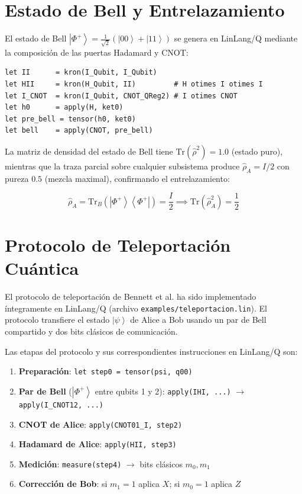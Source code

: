 \documentclass[12pt, a4paper, openany]{report}
\theoremstyle{definition}
\newcommand{\ket}[1]{\left|#1\right\rangle}
\newcommand{\bra}[1]{\left\langle#1\right|}
\newcommand{\density}{\hat{\rho}}
\newcommand{\tr}{\mathrm{Tr}}
\begin{document}
\section{Estado de Bell y Entrelazamiento}

El estado de Bell $\ket{\Phi^+} = \frac{1}{\sqrt{2}}(\ket{00} + \ket{11})$ se genera en LinLang/Q mediante la composición de las puertas Hadamard y CNOT:

\begin{lstlisting}[caption={Generación del estado de Bell en LinLang/Q}]
let II      = kron(I_Qubit, I_Qubit)
let HII     = kron(H_Qubit, II)         # H otimes I otimes I
let I_CNOT  = kron(I_Qubit, CNOT_QReg2) # I otimes CNOT
let h0      = apply(H, ket0)
let pre_bell = tensor(h0, ket0)
let bell    = apply(CNOT, pre_bell)
\end{lstlisting}

La matriz de densidad del estado de Bell tiene $\tr(\density^2) = 1.0$ (estado puro), mientras que la traza parcial sobre cualquier subsistema produce $\density_A = I/2$ con pureza $0.5$ (mezcla maximal), confirmando el entrelazamiento:

\begin{equation}
  \density_A = \tr_B(\ket{\Phi^+}\bra{\Phi^+}) = \frac{I}{2}
  \implies \tr(\density_A^2) = \frac{1}{2}
\end{equation}

\section{Protocolo de Teleportación Cuántica}

El protocolo de teleportación de Bennett et al.\cite{bennett1993} ha sido implementado íntegramente en LinLang/Q (archivo \texttt{examples/teleportacion.lin}). El protocolo transfiere el estado $\ket{\psi}$ de Alice a Bob usando un par de Bell compartido y dos bits clásicos de comunicación.

Las etapas del protocolo y sus correspondientes instrucciones en LinLang/Q son:

\begin{enumerate}
  \item \textbf{Preparación}: \texttt{let step0 = tensor(psi, q00)}
  \item \textbf{Par de Bell} ($\ket{\Phi^+}$ entre qubits 1 y 2): \texttt{apply(IHI, ...)} $\to$ \texttt{apply(I\_CNOT12, ...)}
  \item \textbf{CNOT de Alice}: \texttt{apply(CNOT01\_I, step2)}
  \item \textbf{Hadamard de Alice}: \texttt{apply(HII, step3)}
  \item \textbf{Medición}: \texttt{measure(step4)} $\to$ bits clásicos $m_0, m_1$
  \item \textbf{Corrección de Bob}: si $m_1=1$ aplica $X$; si $m_0=1$ aplica $Z$
\end{enumerate}
\end{document}
